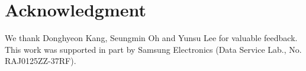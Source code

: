 \section*{Acknowledgment}\label{sec:ack}
We thank Donghyeon Kang, Seungmin Oh and Yunsu Lee for valuable feedback. This work was supported in part by Samsung Electronics (Data Service Lab., No. RAJ0125ZZ-37RF).
